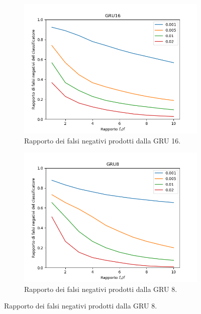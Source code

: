\documentclass[../../main.tex]{subfiles}
\begin{document}
    \begin{figure}[H]
        \centering
        \begin{subfigure}[b]{0.32\textwidth}
            \centering
            \includegraphics[width = \textwidth]{immagini/7/SLBF/GRU16_FNR.png}
            \caption{Rapporto dei falsi negativi prodotti dalla GRU 16.}
            \label{fig:SLBFFNR_GRU16}
        \end{subfigure}
        \begin{subfigure}[b]{0.32\textwidth}
            \centering
            \includegraphics[width = \textwidth]{immagini/7/SLBF/GRU8_FNR.png}
            \caption{Rapporto dei falsi negativi prodotti dalla GRU 8.}
            \label{fig:SLBFFNR_GRU8}

\end{subfigure}
\end{figure}
\end{document}
